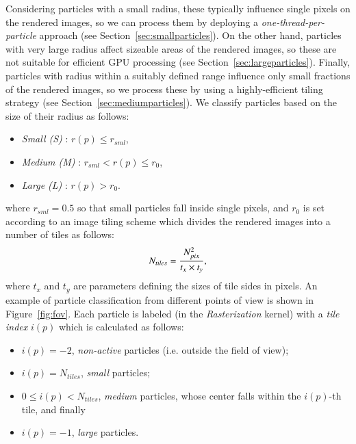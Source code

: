 \documentclass[1p]{elsarticle}
\begin{document}
Considering particles with a small radius, these typically influence single pixels on the rendered images, so we can process them by deploying a {\it one-thread-per-particle} approach (see Section~\ref{sec:smallparticles}). On the other hand, particles with very large radius affect sizeable areas of the rendered images, so these are not suitable for efficient GPU processing (see Section~\ref{sec:largeparticles}). Finally, particles with radius within a suitably defined range influence only small fractions of the rendered images, so we process these by using a highly-efficient tiling strategy (see Section~\ref{sec:mediumparticles}). We classify particles based on the size of their radius as follows:

\begin{itemize}
\item
{\it Small (S)} : $r(p) \le r_{sml}$,
\item
{\it Medium (M)} : $r_{sml} < r(p) \le r_0$,
\item
{\it Large (L)} : $r(p) > r_0$.
\end{itemize}
where $r_{sml} = 0.5$ so that small particles fall inside single pixels, and 
$r_0$ is set according to an image tiling scheme which divides the rendered images
into a number of tiles as follows:  
\begin{equation}\label{tiles}
N_{tiles} = {N_{pix}^2\over t_x \times t_y},
\end{equation}
where $t_x$ and $t_y$ are parameters defining the sizes of tile sides in pixels.
An example of particle classification from different points of view is shown in Figure~\ref{fig:fov}. Each particle is labeled (in the {\it Rasterization} kernel) with a {\it tile index} $i(p)$ which is calculated as follows:
\begin{itemize}
\item
$i(p) = -2$, {\it non-active} particles (i.e. outside the field of view);
\item
$i(p) = N_{tiles}$, {\it small} particles;
\item
$0 \le i(p) < N_{tiles}$, {\it medium} particles, whose center falls within the $i(p)$-th tile, and finally 
\item
$i(p) = -1$, {\it large} particles.
\end{itemize}
\end{document}
